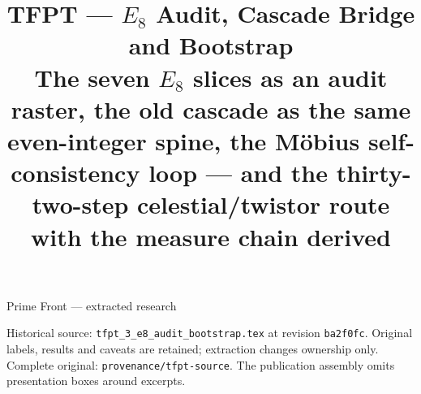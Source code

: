 \documentclass[11pt,a4paper]{article}
\title{\vspace{-1.2cm}\textbf{TFPT --- $E_8$ Audit, Cascade Bridge and Bootstrap}\\[2mm]\large The seven $E_8$ slices as an audit raster, the old cascade as the same even-integer spine, the M\"obius self-consistency loop --- and the thirty-two-step celestial/twistor route with the measure chain derived}
\author{\TFPTauthors}\date{\TFPTdatestamp}
\theoremstyle{definition}
\begin{document}
\begin{center}\Large Prime Front --- extracted research\end{center}
\noindent Historical source: \texttt{tfpt\_3\_e8\_audit\_bootstrap.tex} at revision \texttt{ba2f0fc}. Original labels, results and caveats are retained; extraction changes ownership only. Complete original: \texttt{provenance/tfpt-source}. The publication assembly omits presentation boxes around excerpts.
\tableofcontents
\clearpage

\end{document}
